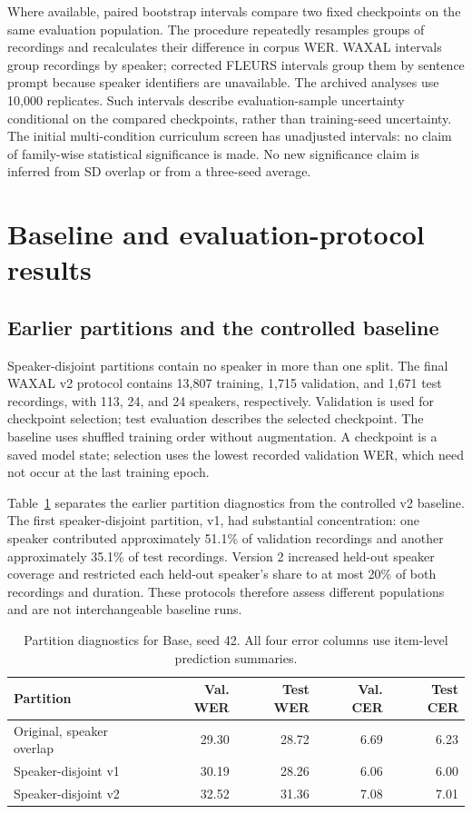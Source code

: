 \documentclass[12pt,a4paper]{report}
\begin{document}
Where available, paired bootstrap intervals compare two fixed checkpoints on the same evaluation population. The procedure repeatedly resamples groups of recordings and recalculates their difference in corpus WER. WAXAL intervals group recordings by speaker; corrected FLEURS intervals group them by sentence prompt because speaker identifiers are unavailable. The archived analyses use 10,000 replicates. Such intervals describe evaluation-sample uncertainty conditional on the compared checkpoints, rather than training-seed uncertainty. The initial multi-condition curriculum screen has unadjusted intervals: no claim of family-wise statistical significance is made. No new significance claim is inferred from SD overlap or from a three-seed average.

\section{Baseline and evaluation-protocol results}

\subsection{Earlier partitions and the controlled baseline}

Speaker-disjoint partitions contain no speaker in more than one split. The final WAXAL v2 protocol contains 13,807 training, 1,715 validation, and 1,671 test recordings, with 113, 24, and 24 speakers, respectively. Validation is used for checkpoint selection; test evaluation describes the selected checkpoint. The baseline uses shuffled training order without augmentation. A checkpoint is a saved model state; selection uses the lowest recorded validation WER, which need not occur at the last training epoch.

Table~\ref{tab:results-protocol} separates the earlier partition diagnostics from the controlled v2 baseline. The first speaker-disjoint partition, v1, had substantial concentration: one speaker contributed approximately 51.1\% of validation recordings and another approximately 35.1\% of test recordings. Version 2 increased held-out speaker coverage and restricted each held-out speaker's share to at most 20\% of both recordings and duration. These protocols therefore assess different populations and are not interchangeable baseline runs.

\begin{table}[htbp]\centering\small
\caption{Partition diagnostics for Base, seed 42. All four error columns use item-level prediction summaries.}\label{tab:results-protocol}
\begin{tabular}{lrrrr}\toprule
Partition & Val. WER & Test WER & Val. CER & Test CER\\\midrule
Original, speaker overlap & 29.30 & 28.72 & 6.69 & 6.23\\
Speaker-disjoint v1 & 30.19 & 28.26 & 6.06 & 6.00\\
Speaker-disjoint v2 & 32.52 & 31.36 & 7.08 & 7.01\\\bottomrule
\end{tabular}\end{table}
\end{document}
